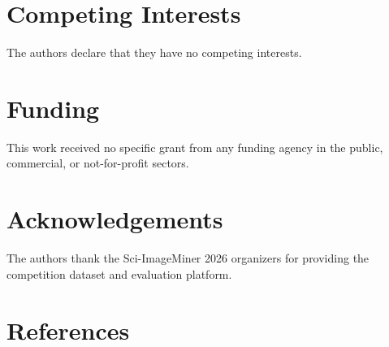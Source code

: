 \documentclass[11pt]{tibop-article}
\begin{document}
\section*{Competing Interests}

The authors declare that they have no competing interests.

\section*{Funding}

This work received no specific grant from any funding agency in the public,
commercial, or not-for-profit sectors.

\section*{Acknowledgements}

The authors thank the Sci-ImageMiner 2026 organizers for providing the
competition dataset and evaluation platform.

\section*{References}

\printbibliography[heading=references]
\end{document}
